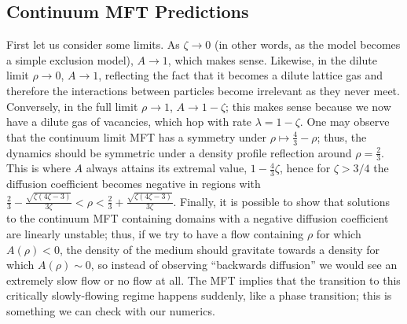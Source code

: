 \subsection{Continuum MFT Predictions} \label{sec:contMFTPred}
First let us consider some limits. As $\zeta \rightarrow 0$ (in other words, as the model becomes a simple exclusion model), $A \rightarrow 1$, which makes sense. Likewise, in the
dilute limit $\rho \rightarrow 0$, $A \rightarrow 1$, reflecting the fact that it becomes a dilute lattice gas and therefore the interactions between particles become irrelevant as they never meet.
Conversely, in the full limit $\rho \rightarrow 1$, $A \rightarrow 1-\zeta$; this makes sense because we now have a dilute gas of vacancies, which hop with rate $\lambda=1-\zeta$.
One may observe that the continuum limit MFT has a symmetry under $\rho \mapsto \frac{4}{3} - \rho$; thus, the dynamics should be symmetric under a density profile reflection around $\rho = \frac{2}{3}$. This is where $A$ always
attains its extremal value, $ 1 - \frac{4}{3}\zeta$, hence for $\zeta>3/4$ the diffusion coefficient becomes negative in regions with
$\frac{2}{3} - \frac{\sqrt{\zeta\left(4\zeta - 3\right)}}{3\zeta} < \rho < \frac{2}{3} + \frac{\sqrt{\zeta\left(4\zeta - 3\right)}}{3\zeta}$.
Finally, it is possible to show that solutions to the continuum MFT containing domains with a negative diffusion coefficient are linearly unstable; thus, if we try to have a flow containing $\rho$ for which $A(\rho)<0$,
the density of the medium should gravitate towards a density for which $A(\rho)\sim 0$, so instead of observing ``backwards diffusion'' we would see an extremely slow flow or no flow at all. The MFT implies that the transition
to this critically slowly-flowing regime happens suddenly, like a phase transition; this is something we can check with our numerics.

